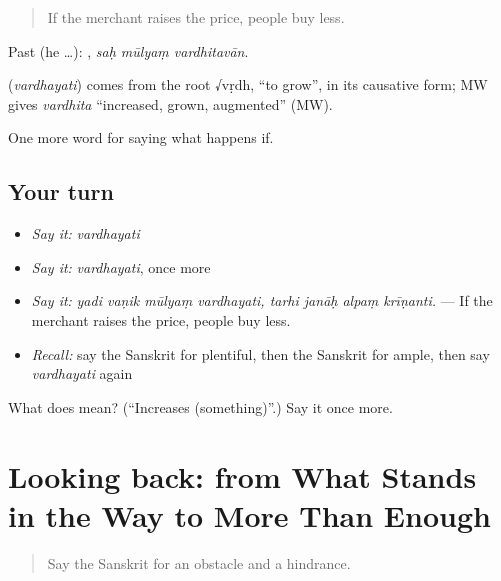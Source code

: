 \begin{quote}
If the merchant raises the price, people buy less.
\end{quote}

Past (he …):   , \emph{saḥ mūlyaṃ vardhitavān}.

\begin{cousinweb}
\textbf{} (\emph{vardhayati}) comes from the root √vṛdh, \textquotedblleft{}to grow\textquotedblright{}, in its causative form; MW gives \emph{vardhita} \textquotedblleft{}increased, grown, augmented\textquotedblright{} (MW).
\end{cousinweb}

\begin{grammarlens}[title={What you've built}]
One more word for saying what happens if.
\end{grammarlens}

\subsection*{Your turn}
\begin{itemize}
\raggedright
  \item \emph{Say it:} \emph{vardhayati}
  \item \emph{Say it:} \emph{vardhayati}, once more
  \item \emph{Say it:} \emph{yadi vaṇik mūlyaṃ vardhayati, tarhi janāḥ alpaṃ krīṇanti.} — If the merchant raises the price, people buy less.
  \item \emph{Recall:} say the Sanskrit for plentiful, then the Sanskrit for ample, then say \emph{vardhayati} again
\end{itemize}

\begin{tcolorbox}[breakable,colback=teal!4,colframe=teal!35!black,title={Before you move on}]
What does  mean? (\textquotedblleft{}Increases (something)\textquotedblright{}.) Say it once more.
\end{tcolorbox}
\section[(dialogue)]{Looking back: from What Stands in the Way to More Than Enough}

\label{lesson:SA-R379-review-372-379}



\begin{quote}
Say the Sanskrit for an obstacle and a hindrance.
\end{quote}

